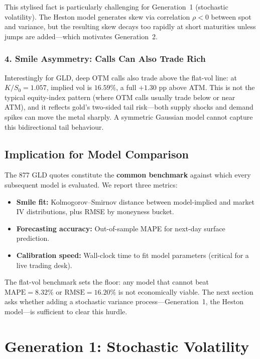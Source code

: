 \documentclass[12pt, a4paper]{article}
\begin{document}
This stylised fact is particularly challenging for Generation~1 (stochastic volatility). The Heston model generates skew via correlation $\rho < 0$ between spot and variance, but the resulting skew decays too rapidly at short maturities unless jumps are added---which motivates Generation~2.

\subsubsection*{4. Smile Asymmetry: Calls Can Also Trade Rich}

Interestingly for GLD, deep OTM calls also trade above the flat-vol line: at $K/S_0 = 1.057$, implied vol is $16.59\%$, a full $+1.30$ pp above ATM. This is not the typical equity-index pattern (where OTM calls usually trade below or near ATM), and it reflects gold's two-sided tail risk---both supply shocks and demand spikes can move the metal sharply. A symmetric Gaussian model cannot capture this bidirectional tail behaviour.

\subsection{Implication for Model Comparison}
\label{subsec:implication}

The 877 GLD quotes constitute the \textbf{common benchmark} against which every subsequent model is evaluated. We report three metrics:

\begin{itemize}[leftmargin=*]
\item \textbf{Smile fit:} Kolmogorov--Smirnov distance between model-implied and market IV distributions, plus RMSE by moneyness bucket.
\item \textbf{Forecasting accuracy:} Out-of-sample MAPE for next-day surface prediction.
\item \textbf{Calibration speed:} Wall-clock time to fit model parameters (critical for a live trading desk).
\end{itemize}

The flat-vol benchmark sets the floor: any model that cannot beat $\text{MAPE} = 8.32\%$ or $\text{RMSE} = 16.20\%$ is not economically viable. The next section asks whether adding a stochastic variance process---Generation~1, the Heston model---is sufficient to clear this hurdle.

\section{Generation 1: Stochastic Volatility}
\label{sec:gen1-heston}
\end{document}
